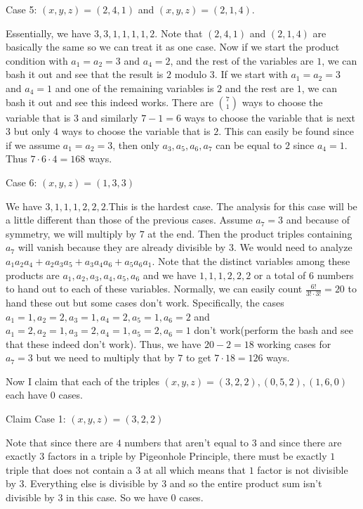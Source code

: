 \begin{enumerate}
 Case 5: $(x, y, z) = (2, 4, 1)$ and $(x, y, z) = (2, 1, 4)$.

 Essentially, we have $3, 3, 1, 1, 1, 1, 2$. Note that $(2, 4, 1)$ and $(2, 1, 4)$ are basically the same so we can treat it as one case. Now if we start the product condition with $a_1 = a_2 = 3$ and $a_4 = 2$, and the rest of the variables are $1$, we can bash it out and see that the result is $2$ modulo $3$. If we start with $a_1 = a_2 = 3$ and $a_4 = 1$ and one of the remaining variables is $2$ and the rest are $1$, we can bash it out and see this indeed works. There are $\binom{7}{1}$ ways to choose the variable that is $3$ and similarly $7 - 1 = 6$ ways to choose the variable that is next $3$ but only $4$ ways to choose the variable that is $2$. This can easily be found since if we assume $a_1 = a_2 = 3$, then only $a_3, a_5, a_6, a_7$ can be equal to $2$ since $a_4 = 1$. Thus $7 \cdot 6 \cdot 4 = 168$ ways.

 Case 6: $(x, y, z) = (1, 3, 3)$

 We have $3, 1, 1, 1, 2, 2, 2$.This is the hardest case. The analysis for this case will be a little different than those of the previous cases. Assume $a_7 = 3$ and because of symmetry, we will multiply by $7$ at the end. Then the product triples containing $a_7$ will vanish because they are already divisible by $3$. We would need to analyze $a_1 a_2 a_4 + a_2 a_3 a_5 + a_3 a_4 a_6 + a_5 a_6 a_1$. Note that the distinct variables among these products are $a_1, a_2, a_3, a_4, a_5, a_6$ and we have $1, 1, 1, 2, 2, 2$ or a total of $6$ numbers to hand out to each of these variables. Normally, we can easily count $\frac{6!}{3! \cdot 3!} = 20$ to hand these out but some cases don't work. Specifically, the cases$a_1 = 1, a_2 = 2, a_3 = 1, a_4 = 2, a_5 = 1, a_6 = 2$ and $a_1 = 2, a_2 = 1, a_3 = 2, a_4 = 1, a_5 = 2, a_6 = 1$ don't work(perform the bash and see that these indeed don't work). Thus, we have $20 - 2 = 18$ working cases for $a_7 = 3$ but we need to multiply that by $7$ to get $7 \cdot 18 = 126$ ways. 

 Now I claim that each of the triples $(x, y, z) = (3, 2, 2), (0, 5, 2), (1, 6, 0)$ each have $0$ cases. 

 Claim Case 1: $(x, y, z) = (3, 2, 2)$

 Note that since there are $4$ numbers that aren't equal to $3$ and since there are exactly $3$ factors in a triple by Pigeonhole Principle, there must be exactly $1$ triple that does not contain a $3$ at all which means that $1$ factor is not divisible by $3$. Everything else is divisible by $3$ and so the entire product sum isn't divisible by $3$ in this case. So we have $0$ cases.


\end{enumerate}
